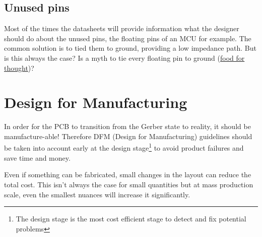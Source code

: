 \documentclass[final]{cubedoc}
\begin{document}
	\subsection{Unused pins}
	
	Most of the times the datasheets will provide information what the designer should do about the unused pins, the floating pins of an MCU for example. The common solution is to tied them to ground, providing a low impedance path. But is this always the case? Is a myth to tie every floating pin to ground (\href{https://learnemc.com/not-so-good-emc-design-guidelines}{food for thought})?
	
	
	
	
	
	\section{Design for Manufacturing}
	
	In order for the PCB to transition from the Gerber state to reality, it should be manufacture-able! Therefore DFM (Design for Manufacturing) guidelines should be taken into account early at the design stage\footnote{The design stage is the most cost efficient stage to detect and fix potential problems} to avoid product failures and save time and money. 
	
	Even if something can be fabricated, small changes in the layout can reduce the total cost. This isn't always the case for small quantities but at mass production scale, even the smallest nuances will increase it significantly. 
	
\end{document}
